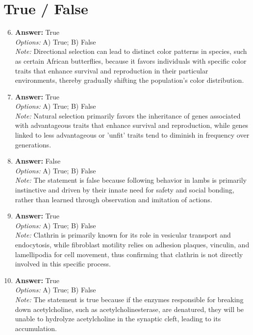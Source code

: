 \documentclass[12pt]{article}
\begin{document}
\section*{True / False}
\begin{enumerate}[label=\arabic*.]
\setcounter{enumi}{5}
\item \textbf{Answer:} True
\\ \textit{Options:} A) True; B) False
\\ \textit{Note:} Directional selection can lead to distinct color patterns in species, such as certain African butterflies, because it favors individuals with specific color traits that enhance survival and reproduction in their particular environments, thereby gradually shifting the population's color distribution.
\item \textbf{Answer:} True
\\ \textit{Options:} A) True; B) False
\\ \textit{Note:} Natural selection primarily favors the inheritance of genes associated with advantageous traits that enhance survival and reproduction, while genes linked to less advantageous or 'unfit' traits tend to diminish in frequency over generations.
\item \textbf{Answer:} False
\\ \textit{Options:} A) True; B) False
\\ \textit{Note:} The statement is false because following behavior in lambs is primarily instinctive and driven by their innate need for safety and social bonding, rather than learned through observation and imitation of actions.
\item \textbf{Answer:} True
\\ \textit{Options:} A) True; B) False
\\ \textit{Note:} Clathrin is primarily known for its role in vesicular transport and endocytosis, while fibroblast motility relies on adhesion plaques, vinculin, and lamellipodia for cell movement, thus confirming that clathrin is not directly involved in this specific process.
\item \textbf{Answer:} True
\\ \textit{Options:} A) True; B) False
\\ \textit{Note:} The statement is true because if the enzymes responsible for breaking down acetylcholine, such as acetylcholinesterase, are denatured, they will be unable to hydrolyze acetylcholine in the synaptic cleft, leading to its accumulation.
\end{enumerate}
\end{document}
